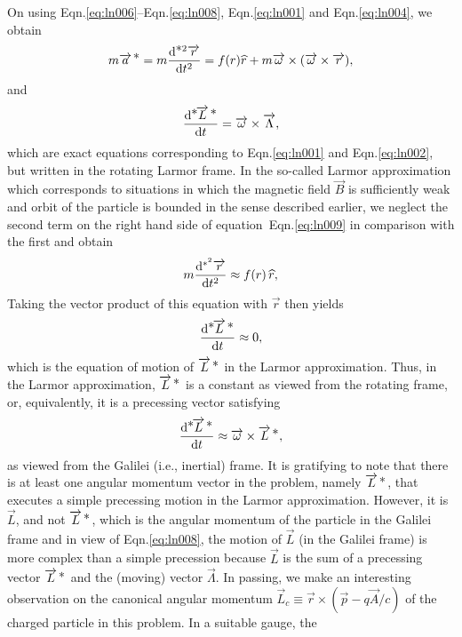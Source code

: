 On using Eqn.\eqref{eq:ln006}--Eqn.\eqref{eq:ln008}, 
Eqn.\eqref{eq:ln001} and Eqn.\eqref{eq:ln004}, we obtain
\begin{align}
m{\overrightarrow{a}^{\,{\textstyle \ast}}}= m\frac{\mathrm{d}{{}^{{\textstyle \ast}2}\negthinspace{\,\overrightarrow{r}}}}{\mathrm{d} {{t^{2}}}} =
f(r){\widehat{r}} +
 m{\overrightarrow{{\omega}}}\times{({\overrightarrow{\ensuremath{{\omega}}}}}\times{\overrightarrow{r})},
\label{eq:ln009}
\end{align}
and
\begin{align}
 \frac{\mathrm{d}{{}^{{\textstyle \ast}}\negthinspace{\ensuremath{{\overrightarrow{L}^{\,{\textstyle \ast}}}}}}}{\mathrm{d} {{t}}} ={\overrightarrow{{\omega}}}\times{\overrightarrow{\Lambda}},
\label{eq:ln010}
\end{align}
which are exact equations corresponding to 
Eqn.\eqref{eq:ln001} and Eqn.\break \eqref{eq:ln002}, but written 
in the rotating Larmor frame. In the so-called Larmor 
approximation which corresponds to situations in which the 
magnetic field $\vec{B}$ is sufficiently weak and orbit of 
the particle is bounded in the sense described earlier, we 
neglect the second term on the right hand side of 
equation~Eqn.\eqref{eq:ln009} in comparison with the first 
and obtain
\begin{align}
 m\frac{\mathrm{d}{^{*^{2}}\overrightarrow{r}}}{\mathrm{d}{t^{2}}} \approx f(r)\,{{\widehat{r}}},
\label{eq:ln011}
\end{align}
Taking the vector product of this equation with $\vec{r}$ 
then yields
\begin{align}
 \frac{\mathrm{d}{{}^{{\textstyle \ast}}\negthinspace{\ensuremath{{\overrightarrow{L}^{\,{\textstyle \ast}}}}}}}{\mathrm{d} {{t}}} \approx 0,
\label{eq:ln012}
\end{align}
which is the equation of motion of ${\overrightarrow{L}^{\,{\textstyle \ast}}}$ in the Larmor 
approximation. Thus, in the Larmor approximation, 
${\overrightarrow{L}^{\,{\textstyle \ast}}}$ 
is a constant as viewed from the rotating frame, or, 
equivalently, it is a precessing vector satisfying
\begin{align}
 \frac{\mathrm{d}{{}^{{\textstyle \ast}}\negthinspace{\ensuremath{{\overrightarrow{L}^{\,{\textstyle \ast}}}}}}}{\mathrm{d} {{t}}} \approx
{\overrightarrow{\ensuremath{{\omega}}}}\times{\ensuremath{{\overrightarrow{L}^{\,{\textstyle \ast}}}}},
\label{eq:ln013}
\end{align}
as viewed from the Galilei (i.e., inertial) frame. It is 
gratifying to note that there is at least one angular 
momentum vector in the problem, namely ${\overrightarrow{L}^{\,{\textstyle \ast}}}$, that 
executes a simple precessing motion in the Larmor 
approximation. However, it is $\vec{L}$, and not 
${\overrightarrow{L}^{\,{\textstyle \ast}}}$, 
which is the angular momentum of the particle in the 
Galilei 
frame and in view of Eqn.\eqref{eq:ln008}, the motion of 
$\vec{L}$ (in the Galilei frame) is more complex than a 
simple precession because $\vec{L}$ is the sum of a 
precessing vector ${\overrightarrow{L}^{\,{\textstyle \ast}}}$ and the (moving) vector 
$\vec{\Lambda}$. In passing, we make an interesting 
observation on the canonical angular momentum $\vec{L}_{c} 
\equiv {\vec{r}}\times{(\vec{p} - q\vec{A}/{c})}$ of the 
charged particle in this problem. In a suitable gauge, the 
